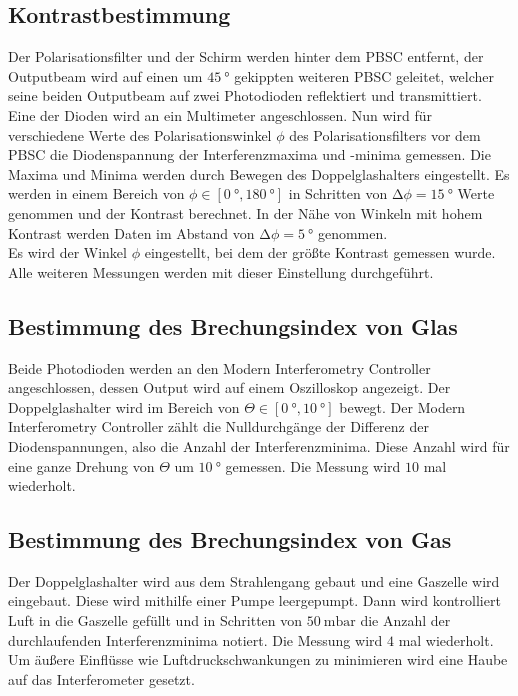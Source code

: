 \subsection{Kontrastbestimmung}
\label{subsec:Kontrastbestimmmung}

\noindent Der Polarisationsfilter und der Schirm werden hinter dem PBSC entfernt, der Outputbeam wird auf einen um $\SI{45}{\degree}$ gekippten weiteren PBSC geleitet, welcher seine beiden
Outputbeam auf zwei Photodioden reflektiert und transmittiert. Eine der Dioden wird an ein Multimeter angeschlossen. Nun wird für verschiedene Werte des Polarisationswinkel $\phi$ des 
Polarisationsfilters vor dem PBSC die Diodenspannung der Interferenzmaxima und -minima gemessen. Die Maxima und Minima werden durch Bewegen des Doppelglashalters eingestellt. Es werden 
in einem Bereich von $\phi \in \left[ \SI{0}{\degree}, \SI{180}{\degree}\right]$ in Schritten von $\increment \phi = \SI{15}{\degree}$ Werte genommen und der Kontrast berechnet. In der Nähe von Winkeln 
mit hohem Kontrast werden Daten im Abstand von $\increment\phi = \SI{5}{\degree}$ genommen.\\
Es wird der Winkel $\phi$ eingestellt, bei dem der größte Kontrast gemessen wurde. Alle weiteren Messungen werden mit dieser Einstellung durchgeführt.


\subsection{Bestimmung des Brechungsindex von Glas}
\label{subsec:n_glas_Durchführung}

\noindent Beide Photodioden werden an den Modern Interferometry Controller angeschlossen, dessen Output wird auf einem Oszilloskop angezeigt. Der Doppelglashalter wird im Bereich von 
$\Theta \in \left[ \SI{0}{\degree}, \SI{10}{\degree}\right]$ bewegt. Der Modern  Interferometry Controller zählt die Nulldurchgänge der Differenz der Diodenspannungen, also die Anzahl 
der Interferenzminima. Diese Anzahl wird für eine ganze Drehung von $\Theta$ um $\SI{10}{\degree}$ gemessen. Die Messung wird $\num{10}$ mal wiederholt.


\subsection{Bestimmung des Brechungsindex von Gas}
\label{subsec:Durchführung_n_Luft}

\noindent Der Doppelglashalter wird aus dem Strahlengang gebaut und eine Gaszelle wird eingebaut. Diese wird mithilfe einer Pumpe leergepumpt. Dann wird kontrolliert Luft in die Gaszelle 
gefüllt und in Schritten von $\SI{50}{\milli\bar}$ die Anzahl der durchlaufenden Interferenzminima notiert. Die Messung wird $\num{4}$ mal wiederholt. Um äußere Einflüsse wie 
Luftdruckschwankungen zu minimieren wird eine Haube auf das Interferometer gesetzt. 